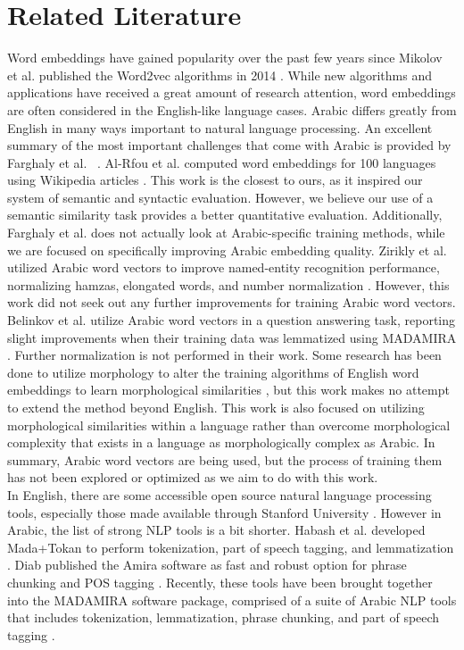 \section{Related Literature}
\label{sec:literature}

Word embeddings have gained popularity over the past few years since Mikolov et al. published the Word2vec algorithms in 2014 \cite{mikolovdist:2013,mikoloveffic:2013}. While new algorithms and applications have received a great amount of research attention, word embeddings are often considered in the English-like language cases. Arabic differs greatly from English in many ways important to natural language processing. An excellent summary of the most important challenges that come with Arabic is provided by Farghaly et al. ~\cite{farghaly:2009}. Al-Rfou et al. computed word embeddings for 100 languages using Wikipedia articles \cite{al:2013}. This work is the closest to ours, as it inspired our system of semantic and syntactic evaluation. However, we believe our use of a semantic similarity task provides a better quantitative evaluation. Additionally, Farghaly et al. does not actually look at Arabic-specific training methods, while we are focused on specifically improving Arabic embedding quality. Zirikly et al. utilized Arabic word vectors to improve named-entity recognition performance, normalizing hamzas, elongated words, and number normalization \cite{zirikly:2015}. However, this work did not seek out any further improvements for training Arabic word vectors. Belinkov et al. utilize Arabic word vectors in a question answering task, reporting slight improvements when their training data was lemmatized using MADAMIRA \cite{belinkov:2015}. Further normalization is not performed in their work. Some research has been done to utilize morphology to alter the training algorithms of English word embeddings to learn morphological similarities \cite{luong2013better}, but this work makes no attempt to extend the method beyond English. This work is also focused on utilizing morphological similarities within a language rather than overcome morphological complexity that exists in a language as morphologically complex as Arabic. In summary, Arabic word vectors are being used, but the process of training them has not been explored or optimized as we aim to do with this work.
\\
In English, there are some accessible open source natural language processing tools, especially those made available through Stanford University \cite{manning-EtAl:2014:P14-5}. However in Arabic, the list of strong NLP tools is a bit shorter. Habash et al. developed Mada+Tokan to perform tokenization, part of speech tagging, and lemmatization \cite{habash:2009}. Diab published the Amira software as fast and robust option for phrase chunking and POS tagging \cite{diab:2009}. Recently, these tools have been brought together into the MADAMIRA software package, comprised of a suite of Arabic NLP tools that includes tokenization, lemmatization, phrase chunking, and part of speech tagging \cite{pasha:2014}. 
